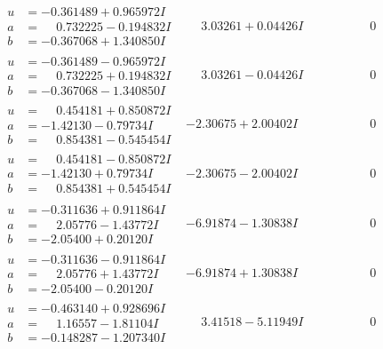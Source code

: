 \documentclass[1p]{elsarticle_modified}
\theoremstyle{definition}
\begin{document}
$$\begin{array}{c|c|c}
\begin{aligned}
u &= -0.361489 + 0.965972 I \\
a &= \phantom{-}0.732225 - 0.194832 I \\
b &= -0.367068 + 1.340850 I\end{aligned}
 & \phantom{-}3.03261 + 0.04426 I & \phantom{-0.000000 } 0 \\ \hline\begin{aligned}
u &= -0.361489 - 0.965972 I \\
a &= \phantom{-}0.732225 + 0.194832 I \\
b &= -0.367068 - 1.340850 I\end{aligned}
 & \phantom{-}3.03261 - 0.04426 I & \phantom{-0.000000 } 0 \\ \hline\begin{aligned}
u &= \phantom{-}0.454181 + 0.850872 I \\
a &= -1.42130 - 0.79734 I \\
b &= \phantom{-}0.854381 - 0.545454 I\end{aligned}
 & -2.30675 + 2.00402 I & \phantom{-0.000000 } 0 \\ \hline\begin{aligned}
u &= \phantom{-}0.454181 - 0.850872 I \\
a &= -1.42130 + 0.79734 I \\
b &= \phantom{-}0.854381 + 0.545454 I\end{aligned}
 & -2.30675 - 2.00402 I & \phantom{-0.000000 } 0 \\ \hline\begin{aligned}
u &= -0.311636 + 0.911864 I \\
a &= \phantom{-}2.05776 - 1.43772 I \\
b &= -2.05400 + 0.20120 I\end{aligned}
 & -6.91874 - 1.30838 I & \phantom{-0.000000 } 0 \\ \hline\begin{aligned}
u &= -0.311636 - 0.911864 I \\
a &= \phantom{-}2.05776 + 1.43772 I \\
b &= -2.05400 - 0.20120 I\end{aligned}
 & -6.91874 + 1.30838 I & \phantom{-0.000000 } 0 \\ \hline\begin{aligned}
u &= -0.463140 + 0.928696 I \\
a &= \phantom{-}1.16557 - 1.81104 I \\
b &= -0.148287 - 1.207340 I\end{aligned}
 & \phantom{-}3.41518 - 5.11949 I & \phantom{-0.000000 } 0 \\ \hline\begin{aligned}

\end{aligned}
\end{array}$$
\end{document}
